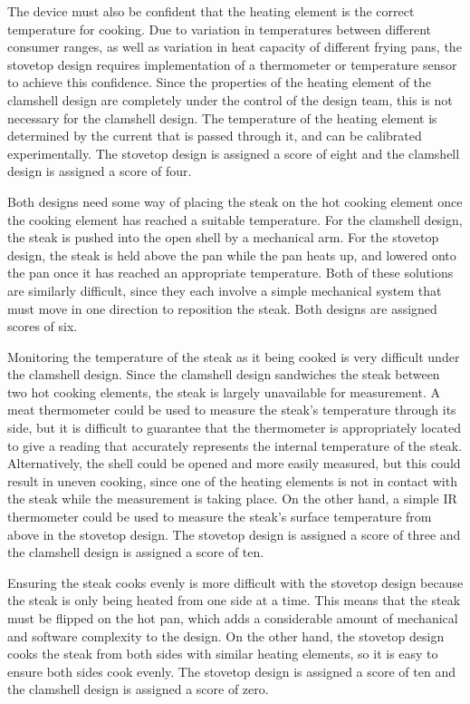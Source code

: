 \documentclass[11pt]{article}
\begin{document}
The device must also be confident that the heating element is the correct temperature for cooking.
Due to variation in temperatures between different consumer ranges, as well as variation in heat capacity of different frying pans, the stovetop design requires implementation of a thermometer or temperature sensor to achieve this confidence.
Since the properties of the heating element of the clamshell design are completely under the control of the design team, this is not necessary for the clamshell design.
The temperature of the heating element is determined by the current that is passed through it, and can be calibrated experimentally.
The stovetop design is assigned a score of eight and the clamshell design is assigned a score of four.

Both designs need some way of placing the steak on the hot cooking element once the cooking element has reached a suitable temperature.
For the clamshell design, the steak is pushed into the open shell by a mechanical arm.
For the stovetop design, the steak is held above the pan while the pan heats up, and lowered onto the pan once it has reached an appropriate temperature.
Both of these solutions are similarly difficult, since they each involve a simple mechanical system that must move in one direction to reposition the steak.
Both designs are assigned scores of six.

Monitoring the temperature of the steak as it being cooked is very difficult under the clamshell design.
Since the clamshell design sandwiches the steak between two hot cooking elements, the steak is largely unavailable for measurement.
A meat thermometer could be used to measure the steak’s temperature through its side, but it is difficult to guarantee that the thermometer is appropriately located to give a reading that accurately represents the internal temperature of the steak.
Alternatively, the shell could be opened and more easily measured, but this could result in uneven cooking, since one of the heating elements is not in contact with the steak while the measurement is taking place.
On the other hand, a simple IR thermometer could be used to measure the steak’s surface temperature from above in the stovetop design.
The stovetop design is assigned a score of three and the clamshell design is assigned a score of ten.

Ensuring the steak cooks evenly is more difficult with the stovetop design because the steak is only being heated from one side at a time.
This means that the steak must be flipped on the hot pan, which adds a considerable amount of mechanical and software complexity to the design.
On the other hand, the stovetop design cooks the steak from both sides with similar heating elements, so it is easy to ensure both sides cook evenly.
The stovetop design is assigned a score of ten and the clamshell design is assigned a score of zero.
\end{document}
